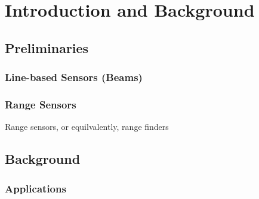 
\chapter{Introduction and Background}
\thispagestyle{myheadings}

\section{Preliminaries}

\subsection{Line-based Sensors (Beams)}

\subsection{Range Sensors}
Range sensors, or equilvalently, range finders

\section{Background}
\subsection{Applications}
